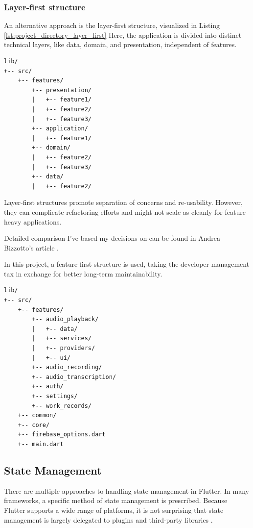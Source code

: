 \documentclass[
  digital,     %
  oneside,     %
  nosansbold,  %
  nocolorbold, %
  lof,         %
  lot,         %
]{fithesis4}
\begin{document}
\newpage
\subsubsection{Layer-first structure}

An alternative approach is the layer-first structure, visualized in Listing \ref{lst:project_directory_layer_first} Here, the application is divided into distinct technical layers, like data, domain, and presentation, independent of features.

\begin{lstlisting}[caption={Layer-first directory structure}, label={lst:project_directory_layer_first}, floatplacement=H, showstringspaces=false]
lib/
+-- src/
    +-- features/
        +-- presentation/
        |   +-- feature1/
        |   +-- feature2/
        |   +-- feature3/
        +-- application/
        |   +-- feature1/
        +-- domain/
        |   +-- feature2/
        |   +-- feature3/
        +-- data/
        |   +-- feature2/
\end{lstlisting}

Layer-first structures promote separation of concerns and re-usability.  
However, they can complicate refactoring efforts and might not scale as cleanly for feature-heavy applications.

Detailed comparison I've based my decisions on can be found in Andrea Bizzotto's article \cite{flutterStructure}.

\newpage
In this project, a feature-first structure is used, taking the developer management tax in exchange for better long-term maintainability.

\begin{lstlisting}[caption={Voice Record App directory structure}, label={lst:project_directory_timesheet}, floatplacement=H, showstringspaces=false]
lib/
+-- src/
    +-- features/
        +-- audio_playback/
        |   +-- data/
        |   +-- services/
        |   +-- providers/
        |   +-- ui/
        +-- audio_recording/
        +-- audio_transcription/
        +-- auth/
        +-- settings/
        +-- work_records/
    +-- common/
    +-- core/
    +-- firebase_options.dart
    +-- main.dart
\end{lstlisting}

\subsection{State Management}
There are multiple approaches to handling state management in Flutter. In many frameworks, a specific method of state management is prescribed. Because Flutter supports a wide range of platforms, it is not surprising that state management is largely delegated to plugins and third-party libraries \cite{flutterStateMgmt}.
\end{document}
